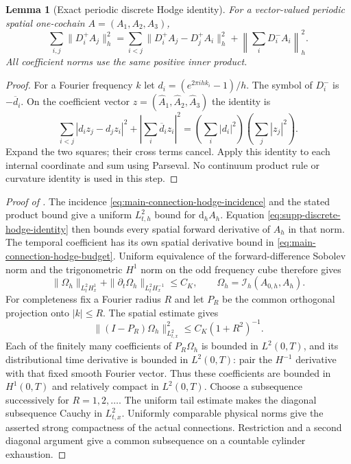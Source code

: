 \documentclass[11pt]{article}
\numberwithin{equation}{section}
\newtheorem{lemma}[lemma]{Lemma}
\theoremstyle{definition}
\theoremstyle{remark}
\newcommand{\dd}{\mathrm d}
\begin{document}
\begin{lemma}[Exact periodic discrete Hodge identity]
\label{lem:supp-connection-hodge}
For a vector-valued periodic spatial one-cochain $A=(A_1,A_2,A_3)$,
\begin{equation}
 \sum_{i,j}\|D_i^+A_j\|_h^2
   =\sum_{i<j}\|D_i^+A_j-D_j^+A_i\|_h^2
      +\left\|\sum_iD_i^-A_i\right\|_h^2.
 \label{eq:supp-discrete-hodge-identity}
\end{equation}
All coefficient norms use the same positive inner product.
\end{lemma}
\begin{proof}
For a Fourier frequency $k$ let $d_i=(e^{2\pi ihk_i}-1)/h$.
The symbol of $D_i^-$ is $-\overline d_i$. On the coefficient vector
$z=(\widehat A_1,\widehat A_2,\widehat A_3)$ the identity is
\[
 \sum_{i<j}|d_i z_j-d_j z_i|^2
       +\left|\sum_i\overline d_i z_i\right|^2
       =\left(\sum_i|d_i|^2\right)\left(\sum_j|z_j|^2\right).
\]
Expand the two squares; their cross terms cancel. Apply this identity to
each internal coordinate and sum using Parseval. No continuum product rule
or curvature identity is used in this step.
\end{proof}

\begin{proof}[Proof of ]
The incidence \eqref{eq:main-connection-hodge-incidence} and the stated
product bound give a uniform $L^2_{t,h}$ bound for $\dd_h A_h$.
Equation \eqref{eq:supp-discrete-hodge-identity} then bounds every spatial
forward derivative of $A_h$ in that norm. The temporal coefficient has its
own spatial derivative bound in
\eqref{eq:main-connection-hodge-budget}. Uniform equivalence of the
forward-difference Sobolev norm and the trigonometric $H^1$ norm on the odd
frequency cube therefore gives
\[
 \|\Omega_h\|_{L^2_tH^1_x}
       +\|\partial_t\Omega_h\|_{L^2_tH^{-1}_x}\le C_K,
 \qquad \Omega_h=\mathcal I_h(A_{0,h},A_h).
\]
For completeness fix a Fourier radius $R$ and let $P_R$ be the common
orthogonal projection onto $|k|\le R$. The spatial estimate gives
\[
 \|(I-P_R)\Omega_h\|_{L^2_{t,x}}^2
       \le C_K(1+R^2)^{-1}.
\]
Each of the finitely many coefficients of $P_R\Omega_h$ is bounded in
$L^2(0,T)$, and its distributional time derivative is bounded in $L^2(0,T)$:
pair the $H^{-1}$ derivative with that fixed smooth Fourier vector. Thus
these coefficients are bounded in $H^1(0,T)$ and relatively compact in
$L^2(0,T)$. Choose a subsequence successively for $R=1,2,\ldots$.
The uniform tail estimate makes the diagonal subsequence Cauchy in
$L^2_{t,x}$. Uniformly comparable physical norms give the asserted strong
compactness of the actual connections. Restriction and a second diagonal
argument give a common subsequence on a countable cylinder exhaustion.
\end{proof}
\end{document}
